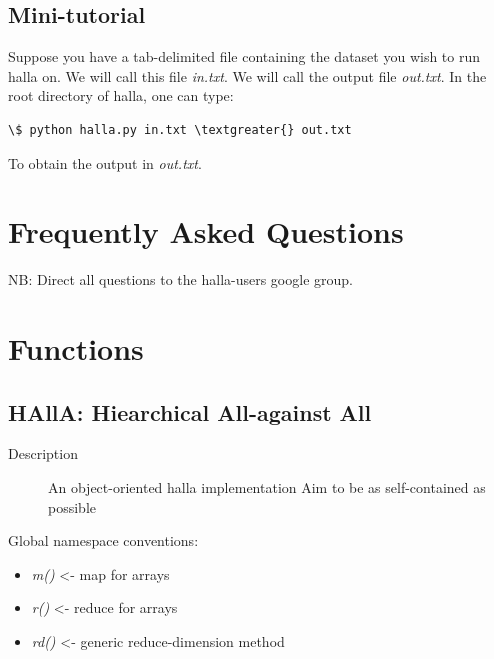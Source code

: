 \documentclass[letterpaper,10pt,english]{sphinxmanual}
\begin{document}
\subsection{Mini-tutorial}
\label{index:mini-tutorial}
Suppose you have a tab-delimited file containing the dataset you wish to run halla on. We will call this file \emph{in.txt}. We will call the output file \emph{out.txt}. In the root directory of halla, one can type:

\begin{Verbatim}[commandchars=\\\{\}]
\$ python halla.py in.txt \textgreater{} out.txt
\end{Verbatim}

To obtain the output in \emph{out.txt}.


\section{Frequently Asked Questions}
\label{index:frequently-asked-questions}
NB: Direct all questions to the halla-users google group.


\section{Functions}
\label{index:module-halla}\label{index:functions}

\subsection{HAllA: Hiearchical All-against All}
\label{index:halla-hiearchical-all-against-all}\begin{description}
\item[{Description}] \leavevmode
An object-oriented halla implementation 
Aim to be as self-contained as possible

\end{description}

Global namespace conventions:
\begin{itemize}
\item {} 
\emph{m()} \textless{}- map for arrays

\item {} 
\emph{r()} \textless{}- reduce for arrays

\item {} 
\emph{rd()} \textless{}- generic reduce-dimension method

\end{itemize}
\end{document}

